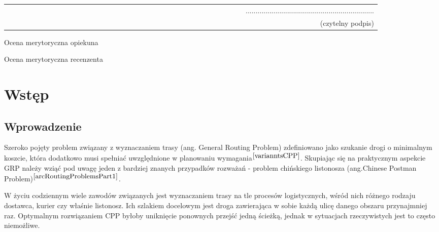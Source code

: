 \documentclass[a4paper, 12pt, twoside, openright]{article}
\begin{document}
\begin{center}
\begin{tabular}{lr}
~~~~~~~~~~~~~~~~~~~~~~~~~~~~~~~~~~~~~~~~~~~~~~~~~~~~~~~~~~~~~~~~~ &
................................................................. \\
~ & {\sf (czytelny podpis)} \\
\end{tabular}
\end{center}



\newpage
\linespread{1.3}
\selectfont

\hspace*{\fill}\large{Ocena merytoryczna opiekuna}

\vspace{85mm}

\newpage
\linespread{1.3}
\selectfont

\hspace*{\fill}\large{Ocena merytoryczna recenzenta}

\vspace{85mm}


\newpage
\tableofcontents


\newpage
\section{Wstęp}
\subsection{Wprowadzenie}
	\indent\par
	Szeroko pojęty problem związany z wyznaczaniem trasy (ang. General Routing Problem) zdefiniowano jako szukanie drogi o minimalnym koszcie, która dodatkowo musi spełniać uwzględnione w planowaniu wymagania$^{\cite{varianntsCPP}}$.
	Skupiając się na praktycznym aspekcie GRP należy wziąć pod uwagę jeden z bardziej znanych przypadków rozważań - problem chińskiego listonosza (ang.Chinese Postman Problem)$^{\cite{arcRoutingProblemsPart1}}$. 


	W życiu codziennym wiele zawodów związanych jest wyznaczaniem trasy na tle procesów logistycznych, wśród nich różnego rodzaju dostawca, kurier czy właśnie listonosz. Ich szlakiem docelowym jest droga zawierająca w sobie każdą ulicę danego obszaru przynajmniej raz. Optymalnym rozwiązaniem CPP byłoby uniknięcie ponownych przejść jedną ścieżką, jednak w sytuacjach rzeczywistych jest to często niemożliwe.
\end{document}
